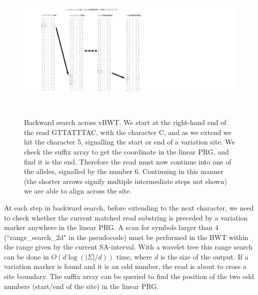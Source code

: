 \documentclass[runningheads,a4paper]{llncs}
\begin{document}
\begin{figure}
\centering
\includegraphics[height=7cm]{BWT.pdf}
\caption{Backward search across vBWT.  We start at the right-hand end of the read GTTATTTAC, with the character C, and as we extend we hit the character 5, signalling the start or end of a variation site. We check the suffix array to get the coordinate in the linear PRG, and find it is the end. Therefore the read must now continue into one of the alleles, signalled by the number 6. Continuing in this manner (the shorter arrows signify multiple intermediate steps not shown) we are able to align across the site.}
\label{fig:example}
\end{figure}

At each step in backward search, before extending to the next character, we need to check whether the current matched read substring is preceded by a variation marker anywhere in the linear PRG. A scan for symbols larger than 4 (``range\_search\_2d" in the pseudocode) must be performed in the BWT within the range given by the current SA-interval. With a wavelet tree this range search can be done in $O(d\log(|\Sigma|/d))$ time, where $d$ is the size of the output. If a variation marker is found and it is an odd number, the read is about to cross a site boundary. The suffix array can be queried to find the position of the two odd numbers (start/end of the site) in the linear PRG.
\end{document}
